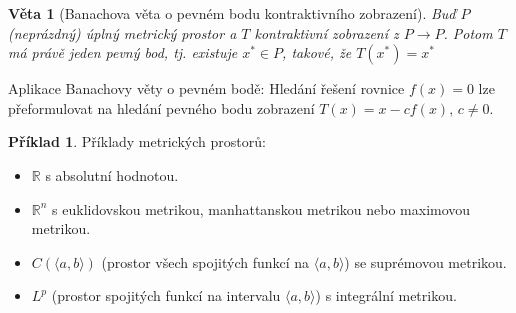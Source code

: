 \documentclass[a4]{report}
\newtheorem{theorem}{Věta}
\theoremstyle{definition}
\newtheorem{example}{Příklad}[section]
\begin{document}
{\begin{theorem}[Banachova věta o pevném bodu kontraktivního zobrazení]
Buď $P$ (neprázdný) úplný metrický prostor a $T$ kontraktivní zobrazení z $P \rightarrow P$. Potom $T$ má právě jeden pevný bod, tj. existuje $x^* \in P $, takové, že $T(x^*)=x^*$ 

\end{theorem}
Aplikace Banachovy věty o pevném bodě: Hledání řešení rovnice $f(x) = 0$ lze přeformulovat na hledání pevného bodu zobrazení $T(x) = x - cf(x), \, c \neq 0$.
\begin{example}
Příklady metrických prostorů:
\begin{itemize}
\item $\mathbb{R}$ s absolutní hodnotou.
\item $\mathbb{R}^n$ s euklidovskou metrikou, manhattanskou metrikou nebo maximovou metrikou.
\item $C(\langle a,b \rangle)$ (prostor všech spojitých funkcí na $\langle a,b \rangle$) se suprémovou metrikou.
\item  $L^p$ (prostor spojitých funkcí na intervalu $\langle a,b \rangle$) s integrální metrikou.
\end{itemize}  
\end{example}

}
\end{document}
